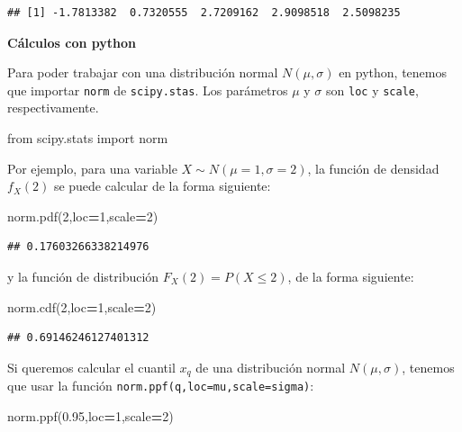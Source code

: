 \documentclass[]{book}
\newenvironment{Shaded}{\begin{snugshade}}{\end{snugshade}}
\newcommand{\DecValTok}[1]{\textcolor[rgb]{0.00,0.00,0.81}{#1}}
\newcommand{\FloatTok}[1]{\textcolor[rgb]{0.00,0.00,0.81}{#1}}
\newcommand{\ImportTok}[1]{#1}
\newcommand{\NormalTok}[1]{#1}
\newcommand{\OperatorTok}[1]{\textcolor[rgb]{0.81,0.36,0.00}{\textbf{#1}}}
\begin{document}
\begin{verbatim}
## [1] -1.7813382  0.7320555  2.7209162  2.9098518  2.5098235
\end{verbatim}

\textbf{Cálculos con python}

Para poder trabajar con una distribución normal \(N(\mu,\sigma)\) en python, tenemos que importar \texttt{norm} de \texttt{scipy.stas}. Los parámetros \(\mu\) y \(\sigma\) son \texttt{loc} y \texttt{scale}, respectivamente.

\begin{Shaded}
\begin{Highlighting}[]
\ImportTok{from}\NormalTok{ scipy.stats }\ImportTok{import}\NormalTok{ norm}
\end{Highlighting}
\end{Shaded}

Por ejemplo, para una variable \(X\sim N(\mu=1,\sigma=2)\), la función de densidad \(f_X(2)\) se puede calcular de la forma siguiente:

\begin{Shaded}
\begin{Highlighting}[]
\NormalTok{norm.pdf(}\DecValTok{2}\NormalTok{,loc}\OperatorTok{=}\DecValTok{1}\NormalTok{,scale}\OperatorTok{=}\DecValTok{2}\NormalTok{)}
\end{Highlighting}
\end{Shaded}

\begin{verbatim}
## 0.17603266338214976
\end{verbatim}

y la función de distribución \(F_X(2) = P(X\leq 2)\), de la forma siguiente:

\begin{Shaded}
\begin{Highlighting}[]
\NormalTok{norm.cdf(}\DecValTok{2}\NormalTok{,loc}\OperatorTok{=}\DecValTok{1}\NormalTok{,scale}\OperatorTok{=}\DecValTok{2}\NormalTok{)}
\end{Highlighting}
\end{Shaded}

\begin{verbatim}
## 0.69146246127401312
\end{verbatim}

Si queremos calcular el cuantil \(x_{q}\) de una distribución normal \(N(\mu,\sigma)\), tenemos que usar la función \texttt{norm.ppf(q,loc=mu,scale=sigma)}:

\begin{Shaded}
\begin{Highlighting}[]
\NormalTok{norm.ppf(}\FloatTok{0.95}\NormalTok{,loc}\OperatorTok{=}\DecValTok{1}\NormalTok{,scale}\OperatorTok{=}\DecValTok{2}\NormalTok{)}
\end{Highlighting}
\end{Shaded}
\end{document}
